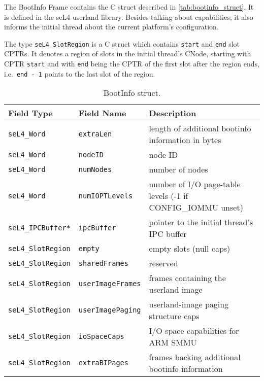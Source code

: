 The BootInfo Frame contains the C struct described in
\autoref{tab:bootinfo_struct}.
It is defined in the seL4 userland library. Besides talking about
capabilities, it also informs the initial thread about
the current platform's configuration.

The type \texttt{seL4\_SlotRegion} is a C struct
which contains \texttt{start} and \texttt{end} slot CPTRs. It denotes a region
of slots in the initial thread's CNode, starting with CPTR \texttt{start} and with
\texttt{end} being the CPTR of the first slot after the region ends, i.e.\
\texttt{end - 1} points to the last slot of the region.

\begin{table}[htb]
  \begin{center}
    \caption{BootInfo struct.}
    \label{tab:bootinfo_struct}
    \begin{tabularx}{\textwidth}{llX}
      \toprule
      Field Type & Field Name & Description \\
      \midrule
      \texttt{seL4\_Word}           & \texttt{extraLen}                & length of additional bootinfo information in bytes \\
      \texttt{seL4\_Word}           & \texttt{nodeID}                  & node ID \\
      \texttt{seL4\_Word}           & \texttt{numNodes}                & number of nodes \\
      \texttt{seL4\_Word}           & \texttt{numIOPTLevels}           & number of I/O page-table levels (-1 if CONFIG_IOMMU unset) \\
      \texttt{seL4\_IPCBuffer*}     & \texttt{ipcBuffer}               & pointer to the initial thread's IPC buffer \\
      \texttt{seL4\_SlotRegion}     & \texttt{empty}                   & empty slots (null caps) \\
      \texttt{seL4\_SlotRegion}     & \texttt{sharedFrames}            & reserved \\
      \texttt{seL4\_SlotRegion}     & \texttt{userImageFrames}         & frames containing the userland image \\
      \texttt{seL4\_SlotRegion}     & \texttt{userImagePaging}         & userland-image paging structure caps \\
      \texttt{seL4\_SlotRegion}     & \texttt{ioSpaceCaps}             & I/O space capabilities for ARM SMMU \\
      \texttt{seL4\_SlotRegion}     & \texttt{extraBIPages}            & frames backing additional bootinfo information \\

\end{tabularx}
\end{center}
\end{table}

